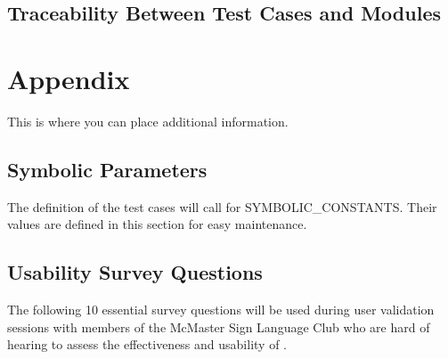 \documentclass[12pt, titlepage]{article}
\begin{document}
\subsection{Traceability Between Test Cases and Modules}

				

\newpage

\section{Appendix}

This is where you can place additional information.

\subsection{Symbolic Parameters}

The definition of the test cases will call for SYMBOLIC\_CONSTANTS.
Their values are defined in this section for easy maintenance.

\subsection{Usability Survey Questions}

The following 10 essential survey questions will be used during user validation sessions with members of the McMaster Sign Language Club who are hard of hearing to assess the effectiveness and usability of .
\end{document}
